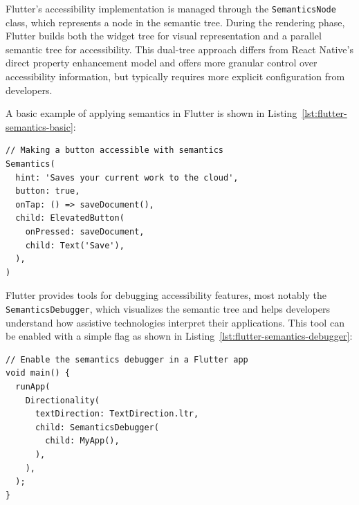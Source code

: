 Flutter's accessibility implementation is managed through the \texttt{SemanticsNode} class, which represents a node in the semantic tree. During the rendering phase, Flutter builds both the widget tree for visual representation and a parallel semantic tree for accessibility. This dual-tree approach differs from React Native's direct property enhancement model and offers more granular control over accessibility information, but typically requires more explicit configuration from developers.

A basic example of applying semantics in Flutter is shown in Listing~\ref{lst:flutter-semantics-basic}:

\begin{lstlisting}[style=DartStyle, caption=Basic Semantics implementation in Flutter, label=lst:flutter-semantics-basic]
// Making a button accessible with semantics
Semantics(
  hint: 'Saves your current work to the cloud',
  button: true,
  onTap: () => saveDocument(),
  child: ElevatedButton(
    onPressed: saveDocument,
    child: Text('Save'),
  ),
)
\end{lstlisting}

\FloatBarrier

Flutter provides tools for debugging accessibility features, most notably the \\\texttt{SemanticsDebugger}, which visualizes the semantic tree and helps developers understand how assistive technologies interpret their applications. This tool can be enabled with a simple flag as shown in Listing~\ref{lst:flutter-semantics-debugger}:

\begin{lstlisting}[style=DartStyle, caption=Using the SemanticsDebugger in Flutter, label=lst:flutter-semantics-debugger]
// Enable the semantics debugger in a Flutter app
void main() {
  runApp(
    Directionality(
      textDirection: TextDirection.ltr,
      child: SemanticsDebugger(
        child: MyApp(),
      ),
    ),
  );
}
\end{lstlisting}

\FloatBarrier

